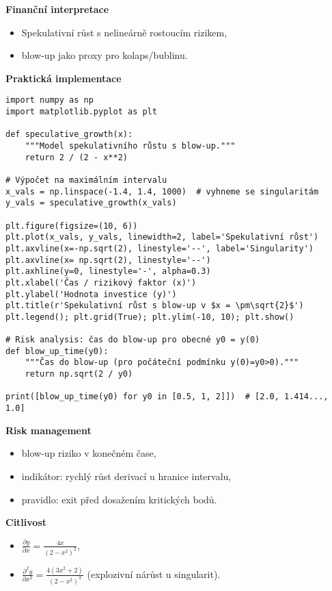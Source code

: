 \begin{example}
\textbf{Finanční interpretace}
\begin{itemize}
\item Spekulativní růst s nelineárně rostoucím rizikem,
\item blow-up jako proxy pro kolaps/bublinu.
\end{itemize}

\textbf{Praktická implementace}
\begin{verbatim}
import numpy as np
import matplotlib.pyplot as plt

def speculative_growth(x):
    """Model spekulativního růstu s blow-up."""
    return 2 / (2 - x**2)

# Výpočet na maximálním intervalu
x_vals = np.linspace(-1.4, 1.4, 1000)  # vyhneme se singularitám
y_vals = speculative_growth(x_vals)

plt.figure(figsize=(10, 6))
plt.plot(x_vals, y_vals, linewidth=2, label='Spekulativní růst')
plt.axvline(x=-np.sqrt(2), linestyle='--', label='Singularity')
plt.axvline(x= np.sqrt(2), linestyle='--')
plt.axhline(y=0, linestyle='-', alpha=0.3)
plt.xlabel('Čas / rizikový faktor (x)')
plt.ylabel('Hodnota investice (y)')
plt.title(r'Spekulativní růst s blow-up v $x = \pm\sqrt{2}$')
plt.legend(); plt.grid(True); plt.ylim(-10, 10); plt.show()

# Risk analysis: čas do blow-up pro obecné y0 = y(0)
def blow_up_time(y0):
    """Čas do blow-up (pro počáteční podmínku y(0)=y0>0)."""
    return np.sqrt(2 / y0)

print([blow_up_time(y0) for y0 in [0.5, 1, 2]])  # [2.0, 1.414..., 1.0]
\end{verbatim}

\textbf{Risk management}
\begin{itemize}
\item blow-up riziko v konečném čase,
\item indikátor: rychlý růst derivací u hranice intervalu,
\item pravidlo: exit před dosažením kritických bodů.
\end{itemize}

\textbf{Citlivost}
\begin{itemize}
\item $\displaystyle \frac{\partial y}{\partial x}=\frac{4x}{(2-x^2)^2}$,
\item $\displaystyle \frac{\partial^2 y}{\partial x^2}=\frac{4(3x^2+2)}{(2-x^2)^3}$ (explozivní nárůst u singularit).
\end{itemize}
\end{example}

